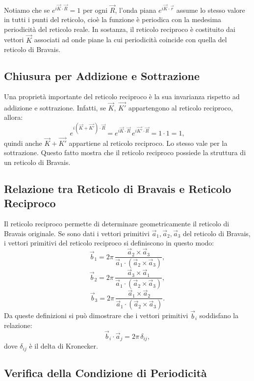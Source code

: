 Notiamo che se \(e^{i\vec{K}\cdot \vec{R}} = 1\) per ogni \(\vec{R}\), l'onda piana \(e^{i\vec{K}\cdot \vec{r}}\) assume lo stesso valore in tutti i punti del reticolo, cioè la funzione è periodica con la medesima periodicità del reticolo reale. In sostanza, il reticolo reciproco è costituito dai vettori \(\vec{K}\) associati ad onde piane la cui periodicità coincide con quella del reticolo di Bravais.

\subsection*{Chiusura per Addizione e Sottrazione}

Una proprietà importante del reticolo reciproco è la sua invarianza rispetto ad addizione e sottrazione. Infatti, se \( \vec{K},\, \vec{K'} \) appartengono al reticolo reciproco, allora:
\[
e^{i(\vec{K}+\vec{K'}) \cdot \vec{R}} = e^{i\vec{K}\cdot \vec{R}}\, e^{i\vec{K'}\cdot \vec{R}} = 1 \cdot 1 = 1,
\]
quindi anche \( \vec{K}+\vec{K'} \) appartiene al reticolo reciproco. Lo stesso vale per la sottrazione. Questo fatto mostra che il reticolo reciproco possiede la struttura di un reticolo di Bravais.

\subsection*{Relazione tra Reticolo di Bravais e Reticolo Reciproco}

Il reticolo reciproco permette di determinare geometricamente il reticolo di Bravais originale. Se sono dati i vettori primitivi \( \vec{a}_1, \vec{a}_2, \vec{a}_3 \) del reticolo di Bravais, i vettori primitivi del reticolo reciproco si definiscono in questo modo:
\[
\vec{b}_1 = 2\pi\, \frac{\vec{a}_2 \times \vec{a}_3}{\vec{a}_1 \cdot (\vec{a}_2 \times \vec{a}_3)},
\]
\[
\vec{b}_2 = 2\pi\, \frac{\vec{a}_3 \times \vec{a}_1}{\vec{a}_1 \cdot (\vec{a}_2 \times \vec{a}_3)},
\]
\[
\vec{b}_3 = 2\pi\, \frac{\vec{a}_1 \times \vec{a}_2}{\vec{a}_1 \cdot (\vec{a}_2 \times \vec{a}_3)}.
\]
Da queste definizioni si può dimostrare che i vettori primitivi \(\vec{b}_i\) soddisfano la relazione:
\[
\vec{b}_i \cdot \vec{a}_j = 2\pi\, \delta_{ij},
\]
dove \(\delta_{ij}\) è il delta di Kronecker.

\subsection*{Verifica della Condizione di Periodicità}


